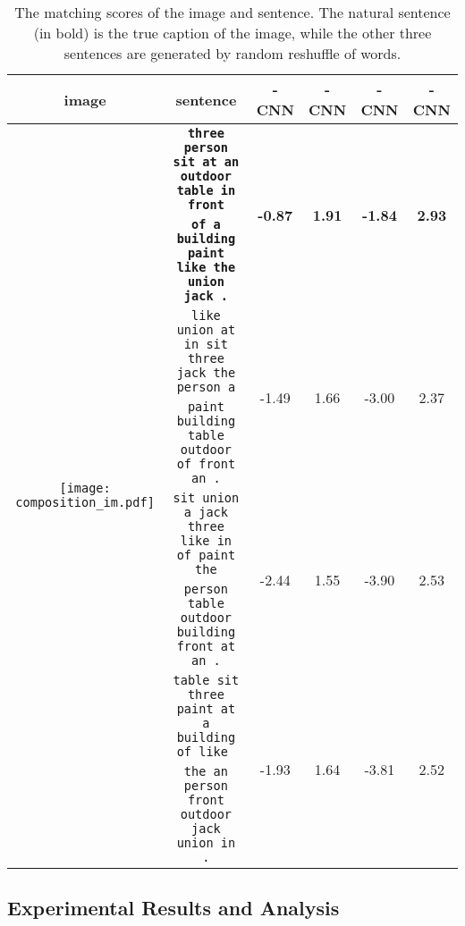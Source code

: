 \documentclass[10pt,twocolumn,letterpaper]{article}
\begin{document}
\begin{table*} \scriptsize
\begin{center}

    \renewcommand{\multirowsetup}{\centering}
    \begin{tabular}{c|c|cccc}
    \hline

     image   &sentence & {-CNN} & {-CNN} & {-CNN} & {-CNN}\\
        \hline
        \hline
  \multirow{8}{*}{\texttt{[image: composition\_im.pdf]}} &\texttt{\textbf{three person sit at an outdoor table in front}} & \multirow{2}{*}{\textbf{-0.87}} & \multirow{2}{*}{\textbf{1.91}} & \multirow{2}{*}{\textbf{-1.84}} & \multirow{2}{*}{\textbf{2.93}}  \\
  &\texttt{\textbf{of a building paint like the union jack .}} & & & &  \\
  \cline{2-6}
  &\texttt{like union at in sit three jack the person a}&\multirow{2}{*}{-1.49} & \multirow{2}{*}{1.66} & \multirow{2}{*}{-3.00} & \multirow{2}{*}{2.37}  \\
  &\texttt{paint building table outdoor of front an .} & & & &  \\
  \cline{2-6}
  &\texttt{sit union a jack three like in of paint the}&\multirow{2}{*}{-2.44} & \multirow{2}{*}{1.55} & \multirow{2}{*}{-3.90} & \multirow{2}{*}{2.53}  \\
  &\texttt{person table outdoor building front at an .} & & & &  \\
 \cline{2-6}
&\texttt{table sit three paint at a building of like }&\multirow{2}{*}{-1.93} & \multirow{2}{*}{1.64} & \multirow{2}{*}{-3.81} & \multirow{2}{*}{2.52} \\
  &\texttt{the an person front outdoor jack union in .} & & & &  \\
  \hline
  \hline

    \end{tabular}


\end{center}
\caption{The matching scores of the image and sentence. The natural sentence (in bold) is the true caption of the image, while the other three sentences are generated by random reshuffle of words.}
\label{table:composition}
\vspace{-10pt}
\end{table*}


\subsection{Experimental Results and Analysis}
\end{document}
